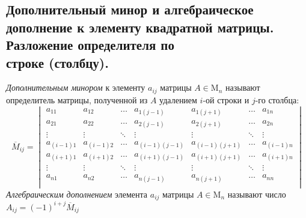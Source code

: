 \documentclass[a4paper, 12pt]{article}
\begin{document}
\subsection{Дополнительный минор и алгебраическое дополнение к элементу квадратной матрицы. Разложение определителя по\\ строке (столбцу).}
\textit{Дополнительным минором} к элементу $a_{ij}$ матрицы $A \in \mathrm{M}_n$ называют определитель матрицы, полученной из $A$ удалением $i$-ой строки и $j$-го столбца:
\[\overline{M}_{ij} = \begin{vmatrix}
a_{11} & a_{12} & \ldots & a_{1(j-1)} & a_{1(j+1)} & \ldots & a_{1n} \\
a_{21} & a_{22} & \ldots & a_{2(j-1)} & a_{2(j+1)} & \ldots & a_{2n} \\
\vdots & \vdots & \ddots & \vdots     & \vdots     & \ddots & \vdots \\
a_{(i-1)1} & a_{(i-1)2} & \ldots & a_{(i-1)(j-1)} & a_{(i-1)(j+1)} & \ldots & a_{(i-1)n} \\
a_{(i+1)1} & a_{(i+1)2} & \ldots & a_{(i+1)(j-1)} & a_{(i+1)(j+1)} & \ldots & a_{(i+1)n} \\
\vdots & \vdots & \ddots & \vdots     & \vdots     & \ddots & \vdots \\
a_{n1} & a_{n2} & \ldots & a_{n(j-1)} & a_{n(j+1)} & \ldots & a_{nn} \\
\end{vmatrix}\]
\textit{Алгебраическим дополнением} элемента $a_{ij}$ матрицы $A \in \mathrm{M}_n$ называют число $A_{ij} = (-1)^{i+j}\overline{M}_{ij}$
\end{document}
